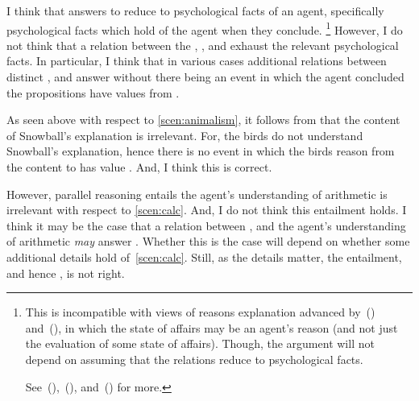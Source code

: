 \begin{note}
  I think that answers to \qWhy{} reduce to psychological facts of an agent, specifically psychological facts which hold of the agent when they conclude.%
  \footnote{
    This is incompatible with views of reasons explanation advanced by~(\cite{Dancy:2000aa}) and~(\cite{Alvarez:2013aa}), in which the state of affairs may be an agent's reason (and not just the evaluation of some state of affairs).
    Though, the argument will not depend on assuming that the relations reduce to psychological facts.

    See~(\cite[413--418]{Hieronymi:2011aa}),~(\cite[3--5]{DOro:2013vh}), and~(\cite[\S2]{Alvarez:2017aa}) for more.
  }
  However, I do not think that a relation between the , , and \pool{} exhaust the relevant psychological facts.
  In particular, I think that in various cases additional relations between distinct ,  and  answer \qWhy{} without there being an event in which the agent concluded the propositions have values from .
\end{note}

\begin{note}
  As seen above with respect to \autoref{scen:animalism}, it follows from \issueInclusion{} that the content of Snowball's explanation is irrelevant.
  For, the birds do not understand Snowball's explanation, hence there is no event in which the birds reason from the content to  has value .
  And, I think this is correct.

  However, parallel reasoning entails the agent's understanding of arithmetic is irrelevant with respect to \autoref{scen:calc}.
  And, I do not think this entailment holds.
  I think it may be the case that a relation between \propM{\gistCalcEq{}},  and the agent's understanding of arithmetic \emph{may} answer \qWhy{}.
  Whether this is the case will depend on whether some additional details hold of~\autoref{scen:calc}.
  Still, as the details matter, the entailment, and hence \issueInclusion{}, is not right.
\end{note}

